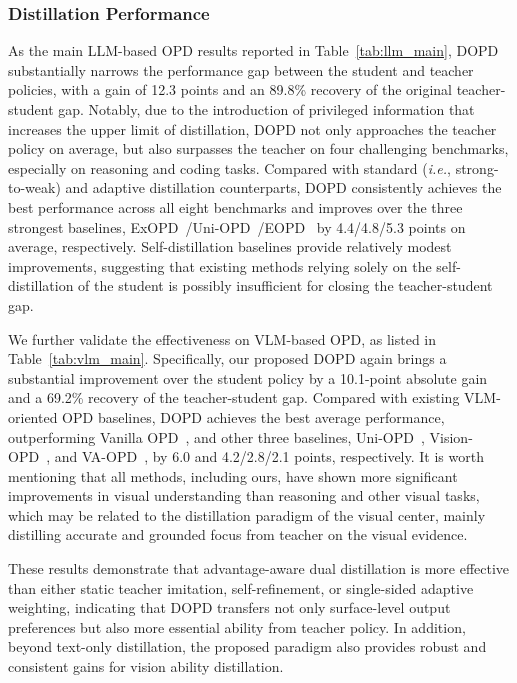 \documentclass{llmxive}
\begin{document}
\subsubsection{Distillation Performance}
As the main LLM-based OPD results reported in Table~\ref{tab:llm_main}, DOPD substantially narrows the performance gap between the student and teacher policies, with a gain of 12.3 points and an 89.8\% recovery of the original teacher-student gap. Notably, due to the introduction of privileged information that increases the upper limit of distillation, DOPD not only approaches the teacher policy on average, but also surpasses the teacher on four challenging benchmarks, especially on reasoning and coding tasks. 
Compared with standard (\textit{i.e.}, strong-to-weak) and adaptive distillation counterparts, DOPD consistently achieves the best performance across all eight benchmarks and improves over the three strongest baselines, ExOPD~\citep{yang2026learning}/Uni-OPD~\citep{hou2026uni}/EOPD~\citep{jin2026entropy} by 4.4/4.8/5.3 points on average, respectively. 
Self-distillation baselines provide relatively modest improvements,  suggesting that existing methods relying solely on the self-distillation of the student is possibly insufficient for closing the teacher-student gap. 



We further validate the effectiveness on VLM-based OPD, as listed in Table~\ref{tab:vlm_main}. Specifically, our proposed DOPD again brings a substantial improvement over the student policy by  a 10.1-point absolute gain and a 69.2\% recovery of the teacher-student gap.  Compared with existing VLM-oriented OPD baselines, DOPD achieves the best average performance, outperforming Vanilla OPD~\citep{thinking2025opd}, and other three baselines, Uni-OPD~\citep{hou2026uni}, Vision-OPD~\citep{yuan2026vision}, and VA-OPD~\citep{liu2026visual}, by 6.0 and 4.2/2.8/2.1 points, respectively. 
It is worth mentioning that all methods, including ours, have shown more significant improvements in visual understanding than reasoning and other visual tasks, which may be related to the distillation paradigm of the visual center, mainly distilling accurate and grounded focus from teacher on the visual evidence.



These results demonstrate that advantage-aware dual distillation is more effective than either static teacher imitation, self-refinement, or single-sided adaptive weighting, indicating that DOPD transfers not only surface-level output preferences but also more essential ability from teacher policy. 
In addition, beyond text-only distillation, the proposed paradigm also provides robust and consistent gains for vision ability distillation.
\end{document}

